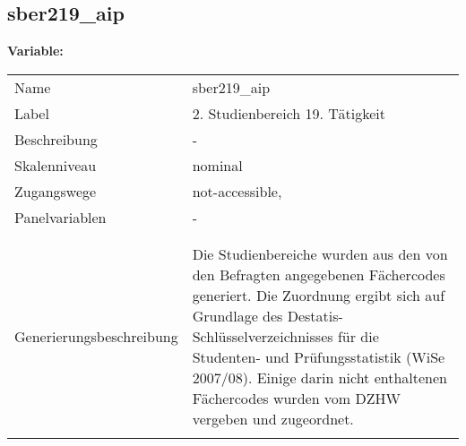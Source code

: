 	
	
	\subsection{sber219\_aip}
	\label{subSection:sber219_aip}

	\noindent\textbf{Variable:}\\
		\begin{tabular}{lL{11.3cm}}
			\label{tableVariable:sber219_aip}
			Name & sber219\_aip \\
			Label & 2. Studienbereich 19. Tätigkeit \\
			Beschreibung & - \\
			Skalenniveau & nominal \\
			Zugangswege &
				not-accessible,
 \\
			Panelvariablen & -
			 \\
			 \\
 \\
					Generierungsbeschreibung & Die Studienbereiche wurden aus den von den Befragten angegebenen Fächercodes generiert. Die Zuordnung ergibt sich auf Grundlage des Destatis-Schlüsselverzeichnisses für die Studenten- und Prüfungsstatistik (WiSe 2007/08). Einige darin nicht enthaltenen Fächercodes wurden vom DZHW vergeben und zugeordnet. 
				 \\	
			 \\
		\end{tabular}






	
	\newpage
